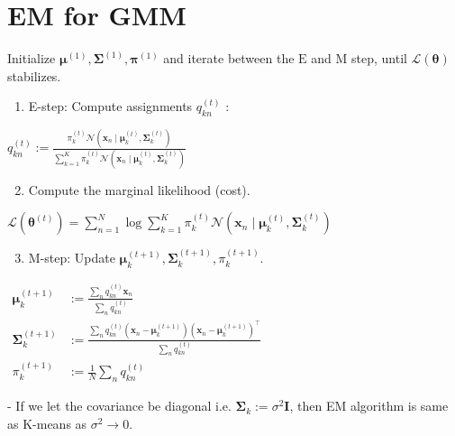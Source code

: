 \section*{EM for GMM}
Initialize $\boldsymbol{\mu}^{(1)}, \boldsymbol{\Sigma}^{(1)}, \boldsymbol{\pi}^{(1)}$ and iterate between the $\mathrm{E}$ and $\mathrm{M}$ step, until $\mathcal{L}(\boldsymbol{\theta})$ stabilizes.

\begin{enumerate}
  \item E-step: Compute assignments $q_{k n}^{(t)}$ :
\end{enumerate}

$
q_{k n}^{(t)}:=\frac{\pi_{k}^{(t)} \mathcal{N}\left(\mathbf{x}_{n} \mid \boldsymbol{\mu}_{k}^{(t)}, \boldsymbol{\Sigma}_{k}^{(t)}\right)}{\sum_{k=1}^{K} \pi_{k}^{(t)} \mathcal{N}\left(\mathbf{x}_{n} \mid \boldsymbol{\mu}_{k}^{(t)}, \boldsymbol{\Sigma}_{k}^{(t)}\right)}
$

\begin{enumerate}
  \setcounter{enumi}{1}
  \item Compute the marginal likelihood (cost).
\end{enumerate}

$
\mathcal{L}\left(\boldsymbol{\theta}^{(t)}\right)=\sum_{n=1}^{N} \log \sum_{k=1}^{K} \pi_{k}^{(t)} \mathcal{N}\left(\mathbf{x}_{n} \mid \boldsymbol{\mu}_{k}^{(t)}, \boldsymbol{\Sigma}_{k}^{(t)}\right)
$

\begin{enumerate}
  \setcounter{enumi}{2}
  \item M-step: Update $\boldsymbol{\mu}_{k}^{(t+1)}, \boldsymbol{\Sigma}_{k}^{(t+1)}, \pi_{k}^{(t+1)}$.
\end{enumerate}

$
\begin{aligned}
\boldsymbol{\mu}_{k}^{(t+1)} & :=\frac{\sum_{n} q_{k n}^{(t)} \mathbf{x}_{n}}{\sum_{n} q_{k n}^{(t)}} \\
\boldsymbol{\Sigma}_{k}^{(t+1)} & :=\frac{\sum_{n} q_{k n}^{(t)}\left(\mathbf{x}_{n}-\boldsymbol{\mu}_{k}^{(t+1)}\right)\left(\mathbf{x}_{n}-\boldsymbol{\mu}_{k}^{(t+1)}\right)^{\top}}{\sum_{n} q_{k n}^{(t)}} \\
\pi_{k}^{(t+1)} & :=\frac{1}{N} \sum_{n} q_{k n}^{(t)}
\end{aligned}
$

- If we let the covariance be diagonal i.e. $\boldsymbol{\Sigma}_{k}:=\sigma^{2} \mathbf{I}$, then EM algorithm is same as K-means as $\sigma^{2} \rightarrow 0$.

